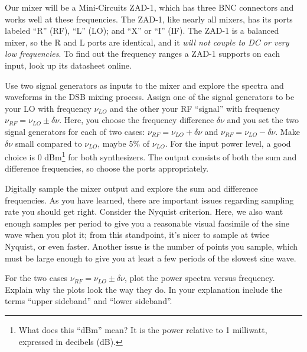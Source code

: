 \documentclass[12pt,preprint]{aastex}
\begin{document}
Our mixer will be a Mini-Circuits ZAD-1, which has three BNC connectors
and works well at these frequencies.  The ZAD-1,
like nearly all mixers, has its ports labeled ``R'' (RF),
``L'' (LO); and ``X'' or ``I'' (IF).
The ZAD-1 is a
balanced mixer, so the R and L ports are identical, and it
{\it will not couple to DC or very low frequencies}.  To find out
the frequency ranges a ZAD-1 supports on each input, 
look up its datasheet online. 


Use two signal generators as inputs to the mixer and
explore the spectra and waveforms in the DSB mixing process. 
Assign one of the signal generators to
be your LO with frequency $\nu_{LO}$ and
the other your RF ``signal'' with frequency $\nu_{RF} = \nu_{LO} \pm
\delta \nu$.  Here, you choose the frequency difference $\delta \nu$ and
you set the two signal generators 
for each of two cases:
$\nu_{RF} = \nu_{LO} + \delta \nu$ and $\nu_{RF} = \nu_{LO} - \delta
\nu$.  Make $\delta \nu$ small compared to $\nu_{LO}$, maybe
$5\%$ of $\nu_{LO}$.  For the input power level, a good choice is 0
dBm\footnote{What does this ``dBm'' mean? It is the power relative to 1
  milliwatt, expressed in decibels (dB).}
  for both synthesizers. The output consists of both the
sum and difference frequencies, so choose the ports appropriately.

Digitally sample the mixer output and explore the
sum and difference frequencies. As you have learned, there are
important issues regarding sampling rate you should get right. Consider
the Nyquist criterion. Here, we also want enough samples per period to
give you a reasonable visual facsimile of the sine wave when you plot
it; from this standpoint, it's nicer to sample at twice
Nyquist, or even faster.  Another issue is the number of points
you sample, which must be large enough to give you at least a few
periods of the slowest sine wave.

For the two cases $\nu_{RF} = \nu_{LO} \pm \delta \nu$, plot the power
spectra versus frequency. Explain why the plots look the way they do. In
your explanation include the terms ``upper sideband'' and ``lower
sideband''.
\end{document}
